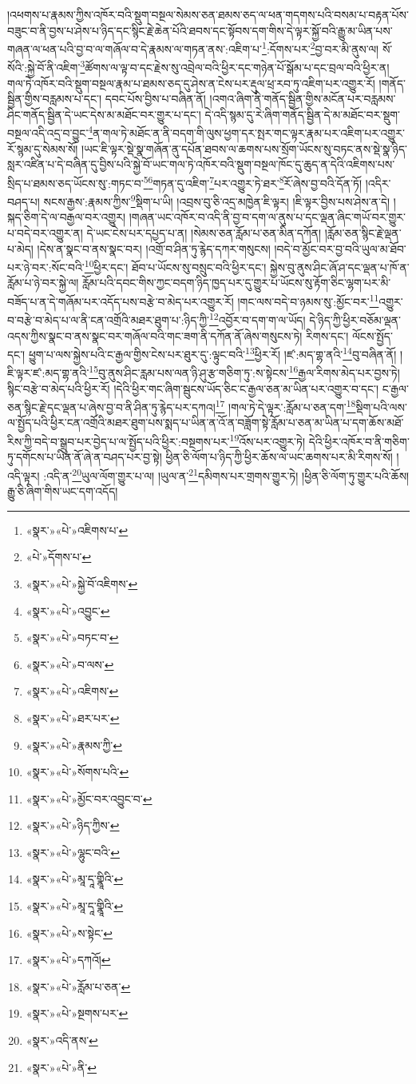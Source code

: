 །འཕགས་པ་རྣམས་ཀྱིས་འཁོར་བའི་སྡུག་བསྔལ་སེམས་ཅན་ཐམས་ཅད་ལ་ཕན་གདགས་པའི་བསམ་པ་བརྟན་པོས་བཟུང་བ་ནི་བྱས་པ་ཤེས་པ་ཉིད་དང་སྙིང་རྗེ་ཆེན་པོའི་ཐབས་དང་སྟོབས་དག་གིས་དེ་ལྟར་སྐྱོ་བའི་རྒྱུ་མ་ཡིན་པས་གཞན་ལ་ཕན་པའི་བྱ་བ་ལ་གཞོལ་བ་དེ་རྣམས་ལ་གཏན་ནས་:འཇིག་པ་\footnote{«སྣར་»«པེ་»འཇིགས་པ་}:དོགས་པར་\footnote{«པེ་»དོགས་པ་}བྱ་བར་མི་ནུས་ལ། སོ་སོའི་:སྐྱེ་བོ་ནི་འཇིག་\footnote{«སྣར་»«པེ་»སྐྱེ་བོ་འཇིགས་}ཚོགས་ལ་ལྟ་བ་དང་རྗེས་སུ་འབྲེལ་བའི་ཕྱིར་དང་གཉེན་པོ་སྒོམ་པ་དང་བྲལ་བའི་ཕྱིར་ན། གལ་ཏེ་འཁོར་བའི་སྡུག་བསྔལ་རྣམ་པ་ཐམས་ཅད་དུ་ཤེས་ན་ངེས་པར་རྡུལ་ཕྲ་རབ་ཏུ་འཇིག་པར་འགྱུར་རོ། །གནོད་སྦྱིན་གྱིས་བརླམས་པ་དང་། དབང་པོས་བྱིས་པ་བཞིན་ནོ། །འགའ་ཞིག་ནི་གནོད་སྦྱིན་གྱིས་མངོན་པར་བརླམས་ཤིང་གནོད་སྦྱིན་དེ་ཡང་དེས་མ་མཐོང་བར་གྱུར་པ་དང་། དེ་འདི་སྙམ་དུ་རེ་ཞིག་གནོད་སྦྱིན་དེ་མ་མཐོང་བར་སྡུག་བསྔལ་འདི་འདྲ་བ་བྱུང་\footnote{«སྣར་»«པེ་»འབྱུང་}ན་གལ་ཏེ་མཐོང་ན་ནི་བདག་གི་ལུས་ཕྱག་དར་སྤར་གང་ལྟར་རྣམ་པར་འཇིག་པར་འགྱུར་རོ་སྙམ་དུ་སེམས་སོ། །ཡང་ཇི་ལྟར་སྡེ་སྣ་གཞོན་ནུ་དཔོན་ཐབས་ལ་ཆགས་པས་སྲོག་ཡོངས་སུ་བཏང་ནས་སྡེ་སྣ་ཉིད་སླར་འཛིན་པ་དེ་བཞིན་དུ་བྱིས་པའི་སྐྱེ་བོ་ཡང་གལ་ཏེ་འཁོར་བའི་སྡུག་བསྔལ་ཁོང་དུ་ཆུད་ན་དེའི་འཇིགས་པས་སྲིད་པ་ཐམས་ཅད་ཡོངས་སུ་:གཏང་བ་\footnote{«སྣར་»«པེ་»བཏང་བ་}\footnote{«སྣར་»«པེ་»བ་ལས་}གཏན་དུ་འཇིག་\footnote{«སྣར་»«པེ་»འཇིགས་}པར་འགྱུར་ཏེ་ཐར་\footnote{«སྣར་»«པེ་»ཐར་པར་}རོ་ཞེས་བྱ་བའི་དོན་ཏོ། །འདིར་བཤད་པ། སངས་རྒྱས་:རྣམས་ཀྱིས་\footnote{«སྣར་»«པེ་»རྣམས་ཀྱི་}སྡིག་པ་ཡི། །འབྲས་བུ་ཅི་འདྲ་མཁྱེན་ཇི་ལྟར། །ཇི་ལྟར་བྱིས་པས་ཤེས་ན་དེ། །སྐད་ཅིག་དེ་ལ་བརྒྱལ་བར་འགྱུར། །གཞན་ཡང་འཁོར་བ་འདི་ནི་བྱ་བ་དག་ལ་ནུས་པ་དང་ལྡན་ཞིང་གཡོ་བར་གྱུར་པ་བདེ་བར་འགྱུར་ན། དེ་ཡང་ངེས་པར་དཔྱད་པ་ན། །སེམས་ཅན་རློམ་པ་ཅན་མིན་དཀོན། །རློམ་ཅན་སྙིང་རྗེ་ལྡན་པ་མེད། །དེས་ན་སྣང་བ་ནས་སྣང་བར། །འགྲོ་བ་ཤིན་ཏུ་རྙེད་དཀར་གསུངས། །བདེ་བ་མྱོང་བར་བྱ་བའི་ཡུལ་མ་ཐོབ་པར་ཉེ་བར་:སོང་བའི་\footnote{«སྣར་»«པེ་»སོགས་པའི་}ཕྱིར་དང་། ཐོབ་པ་ཡོངས་སུ་བསྲུང་བའི་ཕྱིར་དང་། སྐྱེས་བུ་ནུས་ཤིང་ཞོ་ཤ་དང་ལྡན་པ་ཁོ་ན་རློམ་པ་ཉེ་བར་སྐྱེ་ལ། རློམ་པའི་དབང་གིས་ཀྱང་བདག་ཉིད་ཁྱད་པར་དུ་གྱུར་པ་ཡོངས་སུ་རྟོག་ཅིང་ལྷག་པར་མི་བཟོད་པ་ན་དེ་གཞོམ་པར་འདོད་པས་བརྩེ་བ་མེད་པར་འགྱུར་རོ། །གང་ལས་བདེ་བ་ཉམས་སུ་:མྱོང་བར་\footnote{«སྣར་»«པེ་»མྱོང་བར་འབྱུང་བ་}འགྱུར་བ་བརྩེ་བ་མེད་པ་ལ་ནི་ངན་འགྲོའི་མཐར་ཐུག་པ་:ཉིད་ཀྱི་\footnote{«སྣར་»«པེ་»ཉིད་ཀྱིས་}འབྱོར་བ་དག་ག་ལ་ཡོད། དེ་ཉིད་ཀྱི་ཕྱིར་བཅོམ་ལྡན་འདས་ཀྱིས་སྣང་བ་ནས་སྣང་བར་གཞོལ་བའི་གང་ཟག་ནི་དཀོན་ནོ་ཞེས་གསུངས་ཏེ། རིགས་དང་། ལོངས་སྤྱོད་དང་། ཕྱུག་པ་ལས་སྐྱེས་པའི་ང་རྒྱལ་གྱིས་ངེས་པར་ཐུར་དུ་:ལྟུང་བའི་\footnote{«སྣར་»«པེ་»ལྷུང་བའི་}ཕྱིར་རོ། །ཛ་:མད་གྷ་ནའི་\footnote{«སྣར་»«པེ་»མཱ་དཱ་གྣཱིའི་}བུ་བཞིན་ནོ། །ཇི་ལྟར་ཛ་:མད་གྷ་ནའི་\footnote{«སྣར་»«པེ་»མཱ་དཱ་གྣཱིའི་}བུ་ནུས་ཤིང་རླམ་པས་ལན་ཉི་ཤུ་རྩ་གཅིག་ཏུ་:ས་སྟེངས་\footnote{«སྣར་»«པེ་»ས་སྟེང་}རྒྱལ་རིགས་མེད་པར་བྱས་ཏེ། སྙིང་བརྩེ་བ་མེད་པའི་ཕྱིར་རོ། །དེའི་ཕྱིར་གང་ཞིག་སྦུངས་ཡོད་ཅིང་ང་རྒྱལ་ཅན་མ་ཡིན་པར་འགྱུར་བ་དང་། ང་རྒྱལ་ཅན་སྙིང་རྗེ་དང་ལྡན་པ་ཞེས་བྱ་བ་ནི་ཤིན་ཏུ་རྙེད་པར་དཀའ།\footnote{«སྣར་»«པེ་»དཀའོ།} །གལ་ཏེ་དེ་ལྟར་:རློམ་པ་ཅན་དག་\footnote{«སྣར་»«པེ་»རློམ་པ་ཅན་}སྡིག་པའི་ལས་ལ་སྤྱོད་པའི་ཕྱིར་ངན་འགྲོའི་མཐར་ཐུག་པས་སྨད་པ་ཡིན་ན་འོ་ན་བཟློག་སྟེ་རློམ་པ་ཅན་མ་ཡིན་པ་དག་ཆོས་མཐོ་རིས་ཀྱི་བདེ་བ་སྒྲུབ་པར་བྱེད་པ་ལ་སྤྱོད་པའི་ཕྱིར་:བསྔགས་པར་\footnote{«སྣར་»«པེ་»སྔགས་པར་}འོས་པར་འགྱུར་ཏེ། དེའི་ཕྱིར་འཁོར་བ་ནི་གཅིག་ཏུ་དགོངས་པ་ཡིན་ནོ་ཞེ་ན་བཤད་པར་བྱ་སྟེ། ཕྱིན་ཅི་ལོག་པ་ཉིད་ཀྱི་ཕྱིར་ཆོས་ལ་ཡང་ཆགས་པར་མི་རིགས་སོ། །འདི་ལྟར། :འདི་ན་\footnote{«སྣར་»འདི་ནས་}ཡུལ་ལོག་གྱུར་པ་ལ། །ཡུལ་ན་\footnote{«སྣར་»«པེ་»ནི་}དམིགས་པར་གྲགས་གྱུར་ཏེ། །ཕྱིན་ཅི་ལོག་ཏུ་གྱུར་པའི་ཆོས། རྒྱུ་ཅི་ཞིག་གིས་ཡང་དག་འདོད། 